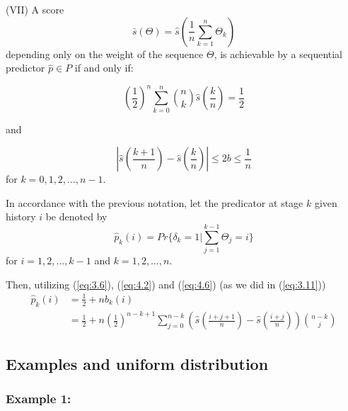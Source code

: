 \documentclass[11pt]{article}
\numberwithin{equation}{section}
\theoremstyle{boldStyle}
\begin{document}
\begin{boxA}
    (VII) A score 
    \begin{equation} \label{eq:4.7}
        \bar{s}(\Theta) = \hat{s}\left(\frac{1}{n} \sum_{k=1}^n \Theta_k \right)
    \end{equation}
    depending only on the weight of the sequence $\Theta$, is achievable by a sequential predictor $\hat{p} \in P$ if and only if:

    \begin{equation} \label{eq:4.8}
        \left(\frac{1}{2}\right)^n \sum_{k=0}^n \binom{n}{k} \hat{s} \left(\frac{k}{n}\right) = \frac{1}{2}
    \end{equation}

    and

    \begin{equation} \label{eq:4.9}
        \left| \hat{s} \left(\frac{k+1}{n}\right) - \hat{s} \left(\frac{k}{n}\right) \right| \leq 2b \leq \frac{1}{n}
    \end{equation}
    for $k = 0, 1, 2, \ldots, n-1$.
\end{boxA}

\bigbreak

In accordance with the previous notation, let the predicator at stage $k$ given history $i$ be denoted by 
\begin{equation} \label{eq:4.10}
    \hat{p}_k(i) = Pr \{ \delta_k = 1 | \sum_{j=1}^{k-1} \Theta_j = i \}
\end{equation}
for $i = 1, 2, \ldots, k-1$ and $k = 1, 2, \ldots, n$.

Then, utilizing (\ref{eq:3.6}), (\ref{eq:4.2}) and (\ref{eq:4.6}) (as we did in (\ref{eq:3.11}))
\begin{equation} \label{eq:4.11}
    \begin{aligned}
        \hat{p}_k(i) &= \frac{1}{2} + n b_k(i) \\
        &= \frac{1}{2} + n \left(\frac{1}{2}\right)^{n-k+1} 
            \sum_{j=0}^{n-k} \left(\hat{s} \left( \frac{i+j+1}{n} \right) - \hat{s} \left( \frac{i+j}{n} \right) \right) \binom{n-k}{j}
    \end{aligned}
\end{equation}

\subsection{Examples and uniform distribution}

\subsubsection{Example 1:}
\end{document}
